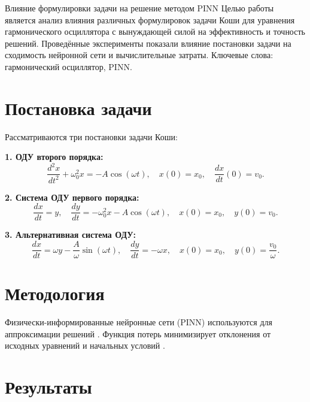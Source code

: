 \documentclass[oneside, a5paper,10pt]{article}
\begin{document}

\makeInf
{Влияние формулировки задачи на решение методом PINN}
{Целью работы является анализ влияния различных формулировок задачи Коши для уравнения гармонического осциллятора с вынуждающей силой на эффективность и точность решений. Проведённые эксперименты показали влияние постановки задачи на сходимость нейронной сети и вычислительные затраты.}
{Ключевые слова: гармонический осциллятор, PINN.}
{\section*{Постановка задачи}
Рассматриваются три постановки задачи Коши:

\textbf{1. ОДУ второго порядка:}
\begin{equation}
\label{DonetskovAD-ODE2}
\frac{d^2x}{dt^2} + \omega_0^2 x = -A\cos(\omega t), \quad x(0) = x_0, \quad \frac{dx}{dt}(0) = v_0.
\end{equation}

\textbf{2. Система ОДУ первого порядка:}
\begin{equation}
\label{DonetskovAD-ODE1}
\frac{dx}{dt} = y, \quad \frac{dy}{dt} = -\omega_0^2 x - A\cos(\omega t), \quad x(0) = x_0, \quad y(0) = v_0.
\end{equation}

\textbf{3. Альтернативная система ОДУ:}
\begin{equation}
\label{DonetskovAD-AltODE}
\frac{dx}{dt} = \omega y - \frac{A}{\omega} \sin(\omega t), \quad \frac{dy}{dt} = -\omega x, \quad x(0) = x_0, \quad y(0) = \frac{v_0}{\omega}.
\end{equation}

\section*{Методология}
Физически-информированные нейронные сети (PINN) используются для аппроксимации решений \cite{bibl:raissi2019}. Функция потерь минимизирует отклонения от исходных уравнений и начальных условий \cite{bibl:lagaris1998}.

\section*{Результаты}

}
\end{document}
